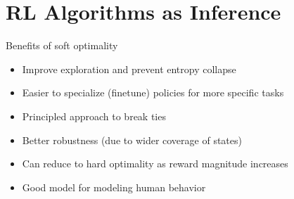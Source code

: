 \section{RL Algorithms as Inference}
Benefits of soft optimality
\begin{itemize}
	\item Improve exploration and prevent entropy collapse
	\item Easier to specialize (finetune) policies for more specific tasks
	\item Principled approach to break ties
	\item Better robustness (due to wider coverage of states)
	\item Can reduce to hard optimality as reward magnitude increases
	\item Good model for modeling human behavior
\end{itemize}

